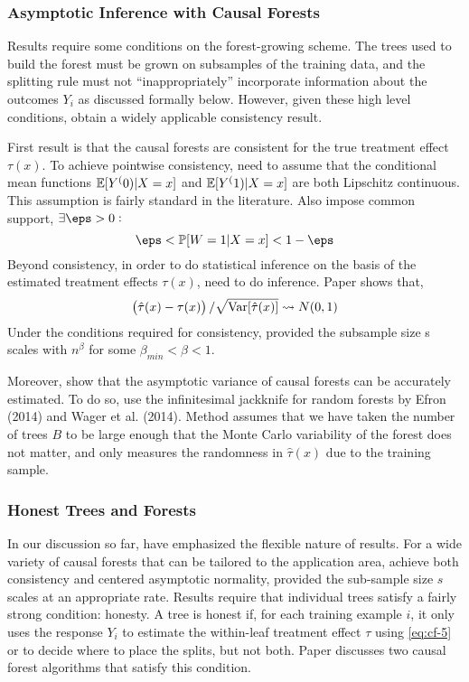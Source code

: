 \subsubsection{Asymptotic Inference with Causal Forests}

Results require some conditions on the forest-growing scheme. The trees used to build the forest must be grown on subsamples of the training data, and the splitting rule must not ``inappropriately'' incorporate information about the outcomes $Y_i$ as discussed formally below. However, given these high level conditions, obtain a widely applicable consistency result.

First result is that the causal forests are consistent for the true treatment effect $\tau(x)$. To achieve pointwise consistency, need to assume that the conditional mean functions $\mathbb{E}[Y^(0)| X = x]$ and $\mathbb{E}[Y^(1) | X = x]$ are both Lipschitz continuous. This assumption is fairly standard in the literature. Also impose common support, $\exists \eps > 0:$
\begin{equation}
	\label{eq:cf-6}
	\eps < \P[W = 1| X = x] < 1-\eps
\end{equation}
Beyond consistency, in order to do statistical inference on the basis of the estimated treatment effects $\tau(x)$, need to do inference. Paper shows that, 
\begin{equation}
	\label{eq:cf-7}
	\left(\hat{\tau}(x) - \tau(x)\right) / \sqrt{\operatorname{Var}[\hat{\tau}(x)]} \rightsquigarrow N(0,1)
\end{equation}
Under the conditions required for consistency, provided the subsample size s scales with $n^\beta$ for some $\beta_{min} < \beta < 1$.

Moreover, show that the asymptotic variance of causal forests can be accurately estimated. To do so, use the infinitesimal jackknife for random forests by Efron (2014) and Wager et al. (2014). Method assumes that we have taken the number of trees $B$ to be large enough that the Monte Carlo variability of the forest does not matter, and only measures the randomness in $\hat{\tau}(x)$ due to the training sample. 

\subsubsection{Honest Trees and Forests}

In our discussion so far, have emphasized the flexible nature of results. For a wide variety of causal forests that can be tailored to the application area, achieve both consistency and centered asymptotic normality, provided the sub-sample size $s$ scales at an appropriate rate. Results require that individual trees satisfy a fairly strong condition: honesty. A tree is honest if, for each training example $i$, it only uses the response $Y_i$ to estimate the within-leaf treatment effect $\tau$ using \eqref{eq:cf-5} or to decide where to place the splits, but not both. Paper discusses two causal forest algorithms that satisfy this condition.

